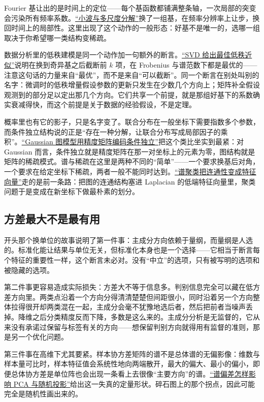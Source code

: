 Fourier 基让出的是时间上的定位——每个基函数都铺满整条轴，一次局部的突变会污染所有频率系数。\hyperref[sec:08-Numerical-Analysis/08-Fourier-and-Spectral-Methods/06]{``小波与多尺度分解''}换了一组基，在频率分辨率上让步，换回时间上的局部性。这里出现了这个动作的一般形态：好基不是唯一的，选哪一组取决于你希望哪一类结构变稀疏。

数据分析里的低秩建模是同一个动作加一句额外的断言。\hyperref[sec:13-Machine-Learning/04-Dimensionality-Reduction/02]{``SVD 给出最佳低秩近似''}说明在换到奇异基之后截断前 \(k\) 项，在 Frobenius 与谱范数下都是最优的——注意这句话的力量来自``最优''，而不是来自``可以截断''。同一个断言在别处叫别的名字：微调时的低秩增量假设参数的更新只发生在少数几个方向上；矩阵补全假设观测到的部分足以定出那几个方向。它们共享一个前提，就是那组好基下的系数确实衰减得快，而这个前提是关于数据的经验假设，不是定理。

概率里也有它的影子，只是名字变了。联合分布在一般坐标下需要指数多个参数，而条件独立结构说的正是``存在一种分解，让联合分布写成局部因子的乘积''。\hyperref[sec:13-Machine-Learning/07-Graphical-and-Sequential-Models/02]{``Gaussian 图模型用精度矩阵编码条件独立''}把这个类比坐实到最紧：对 Gaussian 而言，条件独立就是精度矩阵在那一对坐标上的元素为零，图结构就是矩阵的稀疏模式。谱与稀疏在这里是两种不同的``简单''——一个要求换基后对角，一个要求在给定坐标下稀疏，两者一般不能同时达到。\hyperref[sec:13-Machine-Learning/05-Clustering-and-Data-Geometry/02]{``谱聚类把连通性变成特征向量''}走的是前一条路：把图的连通结构塞进 Laplacian 的低端特征向量里，聚类问题于是变成在新坐标下做最朴素的划分。

\subsection{方差最大不是最有用}

开头那个换单位的故事说明了第一件事：主成分方向依赖于量纲，而量纲是人选的。标准化能让结果与单位无关，但标准化本身也是一个选择——它相当于断言每个特征的重要性一样，这个断言未必对。没有``中立''的选项，只有被写明的选项和被隐藏的选项。

第二件事更容易造成实际损失：方差大不等于信息多。判别信息完全可以藏在低方差方向里。两类点沿着一个方向分得清清楚楚但间距很小，同时沿着另一个方向整体拉得很开却两类混在一起，主成分会毫不犹豫地选后者，然后把前者当噪声丢掉。降维之后分类精度反而下降，多数是这么来的。主成分分析是无监督的，它从来没有承诺过保留与标签有关的方向——想保留判别方向就得用有监督的准则，那是另一个优化问题。

第三件事在高维下尤其要紧。样本协方差矩阵的谱不是总体谱的无偏影像：维数与样本量可比时，样本特征值会系统性地向两端散开，最大的偏大、最小的偏小，即便总体协方差是单位阵也会出现一条看上去很像``主要方向''的谱。\hyperref[sec:11-Mathematical-Statistics/09-Random-Matrix-Theory/03]{``谱偏差怎样影响 PCA 与随机投影''}给出这一失真的定量形状。碎石图上的那个拐点，因此可能完全是随机性画出来的。


